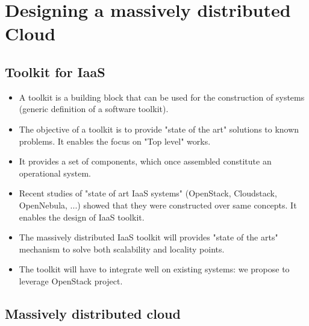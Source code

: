 \section{Designing a massively distributed Cloud}
\label{sec:design}


\subsection{Toolkit for IaaS}

\begin{itemize}

	\item A toolkit is a building block that can be used for the construction of
	systems (generic definition of a software toolkit).

	\item The objective of a toolkit is to provide "state of the art" solutions
	to known problems. It enables the focus on "Top level" works.

	\item It provides a set of components, which once assembled constitute an 
	operational system.

	\item Recent studies of "state of art IaaS systems" (OpenStack, Cloudstack,
	OpenNebula, ...) showed that they were constructed over same concepts. It 
	enables the design of IaaS toolkit.

	\item The massively distributed IaaS toolkit will provides "state of the 
	arts" mechanism to solve both scalability and locality points.

	\item The toolkit will have to integrate well on existing systems: we 
	propose to leverage OpenStack project.

\end{itemize}


\subsection{Massively distributed cloud}

